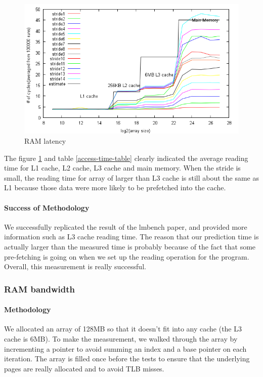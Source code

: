 \begin{figure}[h]
\begin{center}
\includegraphics[scale=0.8]{memoryLatencyImage}
\end{center}
\caption {RAM latency\label{fig:access-timef}}

\end{figure}



The figure \ref{fig:access-timef} and table \ref{access-time-table} clearly indicated the average reading time for L1 cache, L2 cache, L3 cache and main memory. When the stride is small, the reading time for array of larger than L3 cache is still about the same as L1 because those data were more likely to be prefetched into the cache.

\paragraph{Success of Methodology}
We successfully replicated the result of the lmbench paper, and provided more information such as L3 cache reading time. The reason that our prediction time is actually larger than the measured time is probably because of the fact that some pre-fetching is going on when we set up the reading operation for the program. Overall, this measurement is really successful.

\subsubsection{RAM bandwidth}
\paragraph{Methodology}
We allocated an array of 128MB so that it doesn't fit into any cache (the L3 cache is 6MB).
To make the measurement, we walked through the array by incrementing a pointer to avoid summing an index and a base pointer on each iteration.
The array is filled once before the tests to ensure that the underlying pages are really allocated and to avoid TLB misses.



